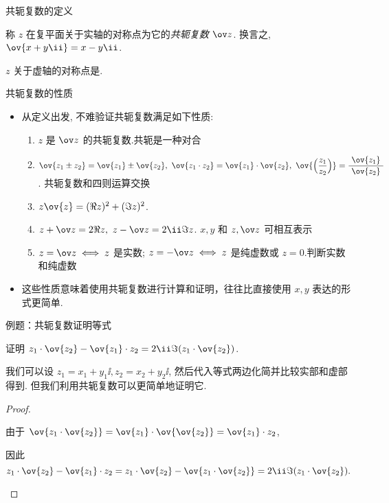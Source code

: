 \begin{frame}{共轭复数的定义}
	\onslide<+->
	\begin{definition}
		称 $z$ 在复平面关于实轴的对称点为它的\emph{共轭复数 $\ov z$}.
		换言之, $\ov{x+y\ii}=x-y\ii$.
	\end{definition}
	\onslide<+->
	\begin{exercise}
		$z$ 关于虚轴的对称点是.
	\end{exercise}
\end{frame}

\begin{frame}{共轭复数的性质}
	\begin{itemize}
		\item 从定义出发, 不难验证共轭复数满足如下性质:
		\begin{enumerate}\bf
			\item $z$ 是 $\ov z$ 的共轭复数.\hfill\alert{共轭是一种对合}
			\item $\ov{z_1\pm z_2}=\ov{z_1}\pm\ov{z_2},\ 
			\ov{z_1\cdot z_2}=\ov{z_1}\cdot\ov{z_2},\ 
			\ov{\Bigl(\dfrac{z_1}{z_2}\Bigr)}=\dfrac{~\ov{z_1}~}{~\ov{z_2}~}$.
			\hfill \alert{共轭复数和四则运算交换}
			\item $z\ov{z}=(\Re z)^2+(\Im z)^2$.
			\item $z+\ov z=2\Re z,\ z-\ov z=2\ii\Im z$.
			\hfill \alert{$x,y$ 和 $z,\ov z$ 可相互表示}
			\item $z=\ov z\iff z$ 是实数; $z=-\ov z\iff z$ 是纯虚数或 $z=0$.\hfill\alert{判断实数和纯虚数}
		\end{enumerate}
		\item 这些性质意味着使用共轭复数进行计算和证明，往往比直接使用 $x,y$ 表达的形式更简单.
	\end{itemize}
\end{frame}


\begin{frame}{例题：共轭复数证明等式}
	\onslide<+->
	\begin{example}
		证明 $z_1\cdot\ov{z_2}-\ov{z_1}\cdot z_2=2\ii\Im(z_1\cdot\ov{z_2})$.
	\end{example}
	\onslide<+->
	我们可以设 $z_1=x_1+y_1\ii,z_2=x_2+y_2\ii$, 然后代入等式两边化简并比较实部和虚部得到.
	\onslide<+->
	但我们利用共轭复数可以更简单地证明它.
	\onslide<+->
	\begin{proof}
		\begin{itemize*}
			\item 由于 $\ov{z_1\cdot\ov{z_2}}=\ov{z_1}\cdot\ov{\ov{z_2}}=\ov{z_1}\cdot z_2$, 
			\item 因此
			\[
				z_1\cdot\ov{z_2}-\ov{z_1}\cdot z_2
				=z_1\cdot\ov{z_2}-\ov{z_1\cdot\ov{z_2}}
				=2\ii\Im(z_1\cdot\ov{z_2}).\qedhere
			\]
		\end{itemize*}
	\end{proof}
\end{frame}


